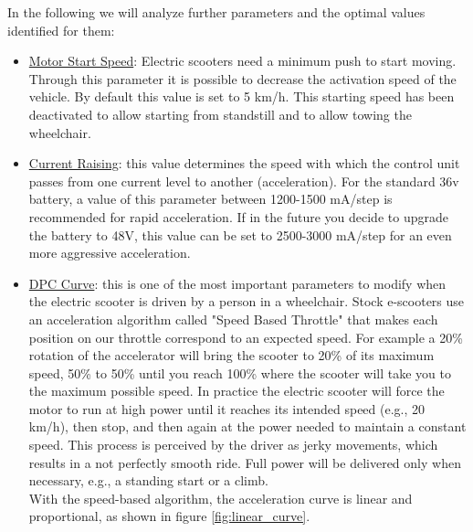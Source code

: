\documentclass[binding=0.6cm,LaM,noexaminfo]{sapthesis}
\begin{document}
\noindent In the following we will analyze further parameters and the optimal values identified for them:
\begin{itemize}
    \item \underline{Motor Start Speed}: Electric scooters need a minimum push to start moving. Through this parameter it is possible to decrease the activation speed of the vehicle. By default this value is set to 5 km/h. This starting speed has been deactivated to allow starting from standstill and to allow towing the wheelchair. 
    \item \underline{Current Raising}: this value determines the speed with which the control unit passes from one current level to another (acceleration). For the standard 36v battery, a value of this parameter between 1200-1500 mA/step is recommended for rapid acceleration. If in the future you decide to upgrade the battery to 48V, this value can be set to 2500-3000 mA/step for an even more aggressive acceleration.
    \item\underline{DPC Curve}: this is one of the most important parameters to modify when the electric scooter is driven by a person in a wheelchair. Stock e-scooters use an acceleration algorithm called "Speed Based Throttle" that makes each position on our throttle correspond to an expected speed. For example a 20\% rotation of the accelerator will bring the scooter to 20\% of its maximum speed, 50\% to 50\% until you reach 100\% where the scooter will take you to the maximum possible speed. In practice the electric scooter will force the motor to run at high power until it reaches its intended speed (e.g., 20 km/h), then stop, and then again at the power needed to maintain a constant speed. This process is perceived by the driver as jerky movements, which results in a not perfectly smooth ride. Full power will be delivered only when necessary, e.g., a standing start or a climb.\\
    With the speed-based algorithm, the acceleration curve is linear and proportional, as shown in figure \ref{fig:linear_curve}.
    

\end{itemize}
\end{document}
